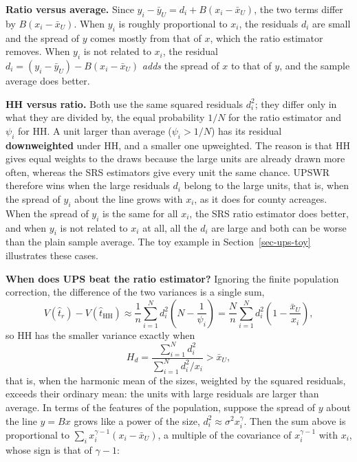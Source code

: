 \documentclass[
  letterpaper,
  DIV=11,
  numbers=noendperiod]{scrreprt}
\renewcommand{\[}{\begin{equation}}
\renewcommand{\]}{\end{equation}}
\begin{document}
\textbf{Ratio versus average.} Since
\(y_i-\bar{y}_U=d_i+B(x_i-\bar{x}_U)\), the two terms differ by
\(B(x_i-\bar{x}_U)\). When \(y_i\) is roughly proportional to \(x_i\),
the residuals \(d_i\) are small and the spread of \(y\) comes mostly
from that of \(x\), which the ratio estimator removes. When \(y_i\) is
not related to \(x_i\), the residual
\(d_i=(y_i-\bar{y}_U)-B(x_i-\bar{x}_U)\) \emph{adds} the spread of \(x\)
to that of \(y\), and the sample average does better.

\textbf{HH versus ratio.} Both use the same squared residuals \(d_i^2\);
they differ only in what they are divided by, the equal probability
\(1/N\) for the ratio estimator and \(\psi_i\) for HH. A unit larger
than average (\(\psi_i>1/N\)) has its residual \textbf{downweighted}
under HH, and a smaller one upweighted. The reason is that HH gives
equal weights to the draws because the large units are already drawn
more often, whereas the SRS estimators give every unit the same chance.
UPSWR therefore wins when the large residuals \(d_i\) belong to the
large units, that is, when the spread of \(y_i\) about the line grows
with \(x_i\), as it does for county acreages. When the spread of \(y_i\)
is the same for all \(x_i\), the SRS ratio estimator does better, and
when \(y_i\) is not related to \(x_i\) at all, all the \(d_i\) are large
and both can be worse than the plain sample average. The toy example in
Section~\ref{sec-ups-toy} illustrates these cases.

\textbf{When does UPS beat the ratio estimator?} Ignoring the finite
population correction, the difference of the two variances is a single
sum, \[
V(\hat{t}_r)-V(\hat{t}_{\mathrm{HH}})\approx\frac1n\sum_{i=1}^N d_i^2\left(N-\frac{1}{\psi_i}\right)
=\frac Nn\sum_{i=1}^N d_i^2\left(1-\frac{\bar{x}_U}{x_i}\right),
\] so HH has the smaller variance exactly when \[
\boxed{H_d=\frac{\sum_{i=1}^N d_i^2}{\sum_{i=1}^N d_i^2/x_i}>\bar{x}_U},
\] that is, when the harmonic mean of the sizes, weighted by the squared
residuals, exceeds their ordinary mean: the units with large residuals
are larger than average. In terms of the features of the population,
suppose the spread of \(y\) about the line \(y=Bx\) grows like a power
of the size, \(d_i^2\approx\sigma^2x_i^{\gamma}\). Then the sum above is
proportional to \(\sum_i x_i^{\gamma-1}(x_i-\bar{x}_U)\), a multiple of
the covariance of \(x_i^{\gamma-1}\) with \(x_i\), whose sign is that of
\(\gamma-1\):
\end{document}
